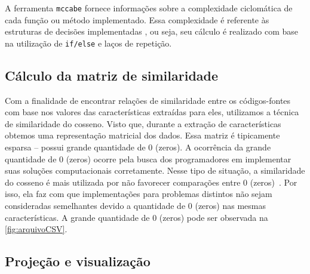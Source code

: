 %	
	
			A ferramenta \texttt{mccabe} \cite{mccabe2013} fornece informações sobre a
			complexidade ciclomática \cite{mccabe} de cada função ou método implementado.
			Essa complexidade é referente às estruturas de decisões implementadas \cite{mccabe},
			ou seja, seu cálculo é realizado com base na utilização de \texttt{if/else} e laços
			de repetição.
			
		
		\subsection{Cálculo da matriz de similaridade}
		
			Com a finalidade de encontrar relações de similaridade entre os códigos-fontes
			com base nos valores das características extraídas para eles, utilizamos a
			técnica de similaridade do cosseno. Visto que, durante a extração de
			características obtemos uma representação matricial dos dados. Essa matriz é
			tipicamente esparsa -- possui grande quantidade de 0 (zeros). 
			A ocorrência da grande quantidade de 0 (zeros) ocorre pela busca
			dos programadores em implementar suas soluções computacionais corretamente.
			Nesse tipo de situação, a similaridade do cosseno é mais utilizada por não
			favorecer comparações entre 0 (zeros)~\cite{Alencar}.
			Por isso, ela faz com que implementações para problemas distintos não sejam
			consideradas semelhantes devido a quantidade de 0 (zeros) nas mesmas
			características. A grande quantidade de 0 (zeros) pode ser observada na
			\cref{fig:arquivoCSV}.
		
		
		\subsection{Projeção e visualização}
		
